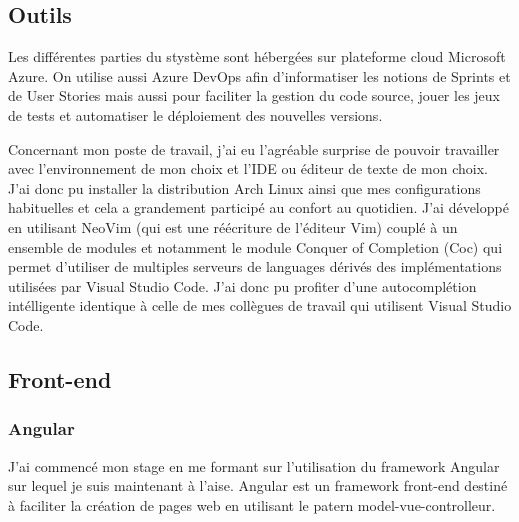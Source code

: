 \documentclass[12pt, a4paper]{report}
\newcommand\tab[1][1cm]{\hspace*{#1}}
\begin{document}
\subsection{Outils}
\tab{}Les différentes parties du stystème sont hébergées sur plateforme cloud Microsoft Azure.\newline
On utilise aussi Azure DevOps afin d'informatiser les notions de Sprints et de User Stories mais aussi pour faciliter la gestion du code source, jouer les jeux de tests et automatiser le déploiement des nouvelles versions.\newline

\tab{}Concernant mon poste de travail, j'ai eu l'agréable surprise de pouvoir travailler avec l'environnement de mon choix et l'IDE ou éditeur de texte de mon choix. J'ai donc pu installer la distribution Arch Linux ainsi que mes configurations habituelles et cela a grandement participé au confort au quotidien. J'ai développé en utilisant NeoVim (qui est une réécriture de l'éditeur Vim) couplé à un ensemble de modules et notamment le module Conquer of Completion (Coc) qui permet d'utiliser de multiples serveurs de languages dérivés des implémentations utilisées par Visual Studio Code. J'ai donc pu profiter d'une autocomplétion intélligente identique à celle de mes collègues de travail qui utilisent Visual Studio Code.
\subsection{Front-end}
\subsubsection{Angular}
\tab{}J'ai commencé mon stage en me formant sur l'utilisation du framework Angular sur lequel je suis maintenant à l'aise.\newline
Angular est un framework front-end destiné à faciliter la création de pages web en utilisant le patern model-vue-controlleur.
\end{document}

